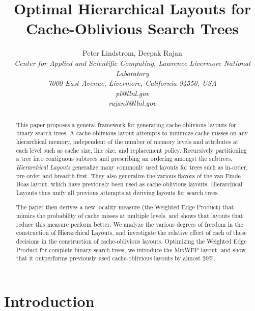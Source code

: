 \documentclass[10pt,conference,letterpaper]{IEEEtran}
\title{Optimal Hierarchical Layouts for \\ Cache-Oblivious Search Trees}
\author{{Peter Lindstrom, Deepak Rajan}\vspace{1.6mm}\\
\fontsize{10}{10}\selectfont\itshape
Center for Applied and Scientific Computing, Lawrence Livermore National Laboratory\\
7000 East Avenue, Livermore, California 94550, USA\\
\fontsize{9}{9}\selectfont\ttfamily\upshape
pl@llnl.gov\\
rajan3@llnl.gov}
\newcommand{\todo}[1]{}
\newcommand{\note}[1]{}
\newcommand{\minwep}{\textsc{MinWEP}\xspace}
\begin{document}
\maketitle

\begin{abstract}
This paper proposes a general framework for generating cache-oblivious layouts for binary search trees. A cache-oblivious layout attempts to minimize cache misses on any hierarchical memory, independent of the number of memory levels and attributes at each level such as cache size, line size, and replacement policy. Recursively partitioning a tree into contiguous subtrees and prescribing an ordering amongst the subtrees, \emph{Hierarchical Layouts} generalize many commonly used layouts for trees such as in-order, pre-order and breadth-first. They also generalize the various flavors of the van Emde Boas layout, which have previously been used as cache-oblivious layouts. Hierarchical Layouts thus unify all previous attempts at deriving layouts for search trees.

The paper then derives a new locality measure (the Weighted Edge Product) that mimics the probability of cache misses at multiple levels, and shows that layouts that reduce this measure perform better. We analyze the various degrees of freedom in the construction of Hierarchical Layouts, and investigate the relative effect of each of these decisions in the construction of cache-oblivious layouts. Optimizing the Weighted Edge Product for complete binary search trees, we introduce the \minwep layout, and show that it outperforms previously used cache-oblivious layouts by almost 20\%. 


 \end{abstract}

\todo{This file is a placeholder for the flow of the paper.}

\section{Introduction}

\todo{
Talk about searches, and how B-Trees optimize a two-level hierarchy.
Hard to generalize to multiple levels.
Introduce Cache-Oblivious B-trees. Review papers, and mention how they optimize for all levels.
Mention generalization (Streaming, string, etc.), but *all build upon COBT.*
}

\note{Talk about the effect of caches, and how/why data has to be optimized for the cache. Done.}
\end{document}
